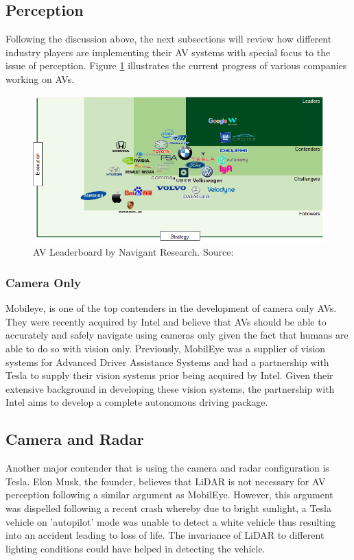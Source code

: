 \subsection{Perception}
Following the discussion above, the next subsections will review how different industry players are implementing their AV systems with special focus to the issue of perception. Figure \ref{fig:players} illustrates the current progress of various companies working on AVs.
\begin{figure}
	\includegraphics[width=\textwidth]{media/avind.png}
	\caption{AV Leaderboard by Navigant Research. Source:\cite{navigantresearch_2018}}
	\label{fig:players}
\end{figure}
\subsubsection*{Camera Only}
Mobileye\cite{mobileye_2018}, is one of the top contenders in the development of camera only AVs. They were recently acquired by Intel and believe that AVs should be able to accurately and safely navigate using cameras only given the fact that humans are able to do so with vision only. Previously, MobilEye was a supplier of vision systems for Advanced Driver Assistance Systems and had a partnership with Tesla to supply their vision systems prior being acquired by Intel. 
Given their extensive background in developing these vision systems, the partnership with Intel aims to develop a complete autonomous driving package\cite{intelsolutions_2018}.
 

\subsection*{Camera and  Radar}
Another major contender that is using the camera and radar configuration is Tesla. Elon Musk, the founder, believes that LiDAR is not necessary for AV perception following a similar argument as MobilEye. However, this argument was dispelled following a recent crash whereby due to bright sunlight, a Tesla vehicle on 'autopilot' mode was unable to detect a white vehicle thus resulting into an accident leading to loss of life. The invariance of LiDAR to different lighting conditions could have helped in detecting the vehicle. 

